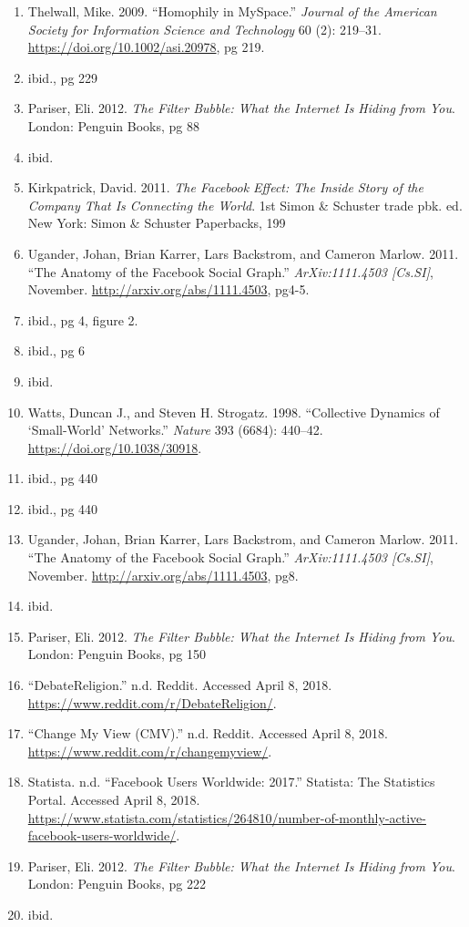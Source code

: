 \documentclass[]{article}
\begin{document}
\begin{enumerate}
\def\labelenumi{\arabic{enumi}.}
\item
  Thelwall, Mike. 2009. ``Homophily in MySpace.'' \emph{Journal of the
  American Society for Information Science and Technology} 60 (2):
  219--31. \url{https://doi.org/10.1002/asi.20978}, pg 219.
\item
  ibid., pg 229
\item
  Pariser, Eli. 2012. \emph{The Filter Bubble: What the Internet Is
  Hiding from You}. London: Penguin Books, pg 88
\item
  ibid.
\item
  Kirkpatrick, David. 2011. \emph{The Facebook Effect: The Inside Story
  of the Company That Is Connecting the World}. 1st Simon \& Schuster
  trade pbk. ed. New York: Simon \& Schuster Paperbacks, 199
\item
  Ugander, Johan, Brian Karrer, Lars Backstrom, and Cameron Marlow.
  2011. ``The Anatomy of the Facebook Social Graph.''
  \emph{ArXiv:1111.4503 {[}Cs.SI{]}}, November.
  \url{http://arxiv.org/abs/1111.4503}, pg4-5.
\item
  ibid., pg 4, figure 2.
\item
  ibid., pg 6
\item
  ibid.
\item
  Watts, Duncan J., and Steven H. Strogatz. 1998. ``Collective Dynamics
  of `Small-World' Networks.'' \emph{Nature} 393 (6684): 440--42.
  \url{https://doi.org/10.1038/30918}.
\item
  ibid., pg 440
\item
  ibid., pg 440
\item
  Ugander, Johan, Brian Karrer, Lars Backstrom, and Cameron Marlow.
  2011. ``The Anatomy of the Facebook Social Graph.''
  \emph{ArXiv:1111.4503 {[}Cs.SI{]}}, November.
  \url{http://arxiv.org/abs/1111.4503}, pg8.
\item
  ibid.
\item
  Pariser, Eli. 2012. \emph{The Filter Bubble: What the Internet Is
  Hiding from You}. London: Penguin Books, pg 150
\item
  ``DebateReligion.'' n.d. Reddit. Accessed April 8, 2018.
  \url{https://www.reddit.com/r/DebateReligion/}.
\item
  ``Change My View (CMV).'' n.d. Reddit. Accessed April 8, 2018.
  \url{https://www.reddit.com/r/changemyview/}.
\item
  Statista. n.d. ``Facebook Users Worldwide: 2017.'' Statista: The
  Statistics Portal. Accessed April 8, 2018.
  \url{https://www.statista.com/statistics/264810/number-of-monthly-active-facebook-users-worldwide/}.
\item
  Pariser, Eli. 2012. \emph{The Filter Bubble: What the Internet Is
  Hiding from You}. London: Penguin Books, pg 222
\item
  ibid.
\end{enumerate}
\end{document}
